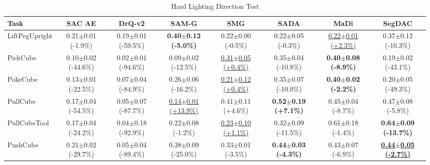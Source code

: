 \begin{table}[htbp]
\centering
\scriptsize
\caption{Hard Lighting Direction Test}
\label{tab:appendix_lightingdirectiontest_hard}
\begin{adjustbox}{max width=\textwidth}
\begin{tabular}{l*{7}{c}}
\toprule
\textbf{Task} & \textbf{SAC AE} & \textbf{DrQ-v2} & \textbf{SAM-G} & \textbf{SMG} & \textbf{SADA} & \textbf{MaDi} & \textbf{SegDAC} \\
\midrule
LiftPegUpright & 0.21$\pm$0.01 \scriptsize{(-1.9\%)} & 0.19$\pm$0.01 \scriptsize{(-59.5\%)} & \textbf{0.40$\pm$0.12 \scriptsize{(-5.0\%)}} & 0.22$\pm$0.00 \scriptsize{(-0.5\%)} & 0.22$\pm$0.05 \scriptsize{(-0.3\%)} & \underline{0.22$\pm$0.01 \scriptsize{(+2.3\%)}} & 0.37$\pm$0.12 \scriptsize{(-10.3\%)} \\
PickCube & 0.10$\pm$0.02 \scriptsize{(-44.6\%)} & 0.02$\pm$0.01 \scriptsize{(-94.6\%)} & 0.09$\pm$0.02 \scriptsize{(-12.5\%)} & \underline{0.31$\pm$0.05 \scriptsize{(+0.4\%)}} & 0.35$\pm$0.04 \scriptsize{(-10.8\%)} & \textbf{0.40$\pm$0.08 \scriptsize{(-8.9\%)}} & 0.19$\pm$0.02 \scriptsize{(-43.1\%)} \\
PokeCube & 0.13$\pm$0.01 \scriptsize{(-22.5\%)} & 0.07$\pm$0.04 \scriptsize{(-84.9\%)} & 0.26$\pm$0.06 \scriptsize{(-16.2\%)} & \underline{0.21$\pm$0.12 \scriptsize{(+0.4\%)}} & 0.35$\pm$0.07 \scriptsize{(-10.0\%)} & \textbf{0.40$\pm$0.02 \scriptsize{(-2.2\%)}} & 0.20$\pm$0.05 \scriptsize{(-49.3\%)} \\
PullCube & 0.17$\pm$0.04 \scriptsize{(-54.5\%)} & 0.05$\pm$0.07 \scriptsize{(-87.7\%)} & \underline{0.14$\pm$0.01 \scriptsize{(+13.9\%)}} & 0.41$\pm$0.11 \scriptsize{(+4.6\%)} & \textbf{0.52$\pm$0.19 \scriptsize{(+7.1\%)}} & 0.45$\pm$0.04 \scriptsize{(-8.7\%)} & 0.47$\pm$0.08 \scriptsize{(-5.8\%)} \\
PullCubeTool & 0.17$\pm$0.04 \scriptsize{(-24.2\%)} & 0.04$\pm$0.18 \scriptsize{(-92.9\%)} & 0.22$\pm$0.08 \scriptsize{(-1.2\%)} & \underline{0.23$\pm$0.10 \scriptsize{(+1.1\%)}} & 0.32$\pm$0.09 \scriptsize{(-11.5\%)} & 0.61$\pm$0.18 \scriptsize{(-1.4\%)} & \textbf{0.64$\pm$0.09 \scriptsize{(-13.7\%)}} \\
PushCube & 0.21$\pm$0.02 \scriptsize{(-29.7\%)} & 0.05$\pm$0.04 \scriptsize{(-89.4\%)} & 0.38$\pm$0.09 \scriptsize{(-25.0\%)} & 0.33$\pm$0.01 \scriptsize{(-3.5\%)} & \textbf{0.44$\pm$0.03 \scriptsize{(-4.3\%)}} & 0.43$\pm$0.07 \scriptsize{(-6.9\%)} & \textbf{\underline{0.44$\pm$0.05 \scriptsize{(-2.7\%)}}} \\

\end{tabular}
\end{adjustbox}
\end{table}
